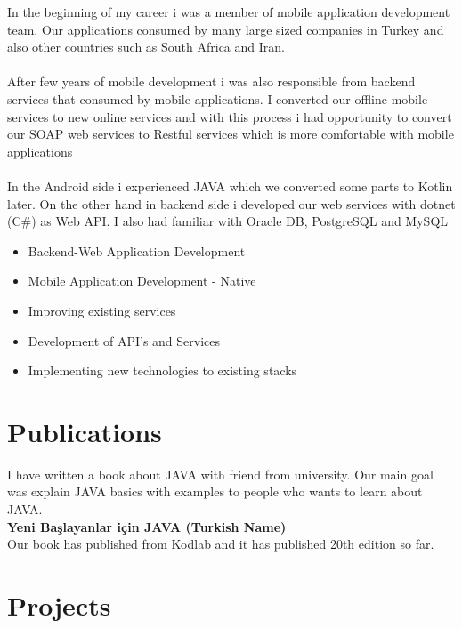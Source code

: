 \documentclass[11pt,a4paper,sans]{moderncv}
\begin{document}
{
	\textnormal
	{
		In the beginning of my career i was a member of mobile application development team. Our applications consumed by many large sized companies in Turkey and also other countries such as South Africa and Iran.
		\\
		\\
		After few years of mobile development i was also responsible from backend services that consumed by mobile applications. I converted our offline mobile services to new online services and with this process i had opportunity to convert our SOAP web services to Restful services which is more comfortable with mobile applications
		\\
		\\
		In the Android side i experienced JAVA which we converted some parts to Kotlin later. On the other hand in backend side i developed our web services with dotnet (C\#) as Web API. I also had familiar with Oracle DB, PostgreSQL and MySQL
	}
	\\
	\begin{itemize}%
		\item Backend-Web Application Development
		\item Mobile Application Development - Native
		\item Improving existing services
		\item Development of API's and Services
		\item Implementing new technologies to existing stacks
	\end{itemize}
}
\pagebreak

\section{Publications}
{
	I have written a book about JAVA with friend from university. Our main goal was explain JAVA basics with examples to people who wants to learn about JAVA. \\
	\textbf{Yeni Başlayanlar için JAVA (Turkish Name)} \\
	Our book has published from Kodlab and it has published 20th edition so far.
}

\section{Projects}
\end{document}
